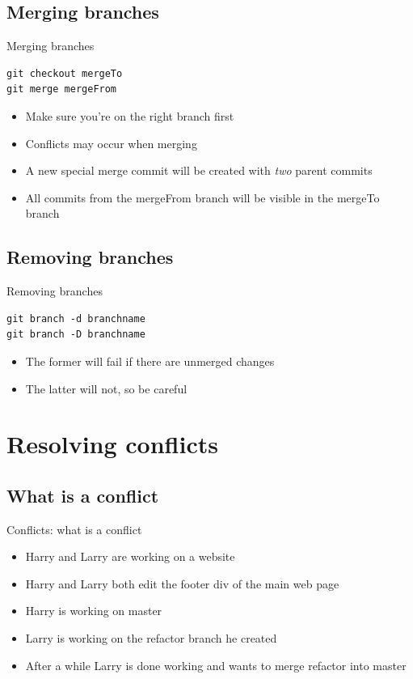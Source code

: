 \documentclass[10pt,a4paper]{beamer}
\begin{document}
\subsection{Merging branches}
\begin{frame}[fragile]{Merging branches}
\begin{verbatim}
git checkout mergeTo
git merge mergeFrom
\end{verbatim}
\begin{itemize}
\item Make sure you're on the right branch first
\item Conflicts may occur when merging
\item A new special merge commit will be created with \textit{two} parent commits
\item All commits from the mergeFrom branch will be visible in the mergeTo branch
\end{itemize}
\end{frame}

\subsection{Removing branches}
\begin{frame}[fragile]{Removing branches}
\begin{verbatim}
git branch -d branchname
git branch -D branchname
\end{verbatim}
\begin{itemize}
\item The former will fail if there are unmerged changes
\item The latter will not, so be careful
\end{itemize}
\end{frame}


\section{Resolving conflicts}

\subsection{What is a conflict}
\begin{frame}{Conflicts: what is a conflict}
\begin{itemize}
	\item Harry and Larry are working on a website
	\item Harry and Larry both edit the footer div of the main web page
	\item Harry is working on master
	\item Larry is working on the refactor branch he created
	\item After a while Larry is done working and wants to merge refactor into master
\end{itemize}
\end{frame}
\end{document}
